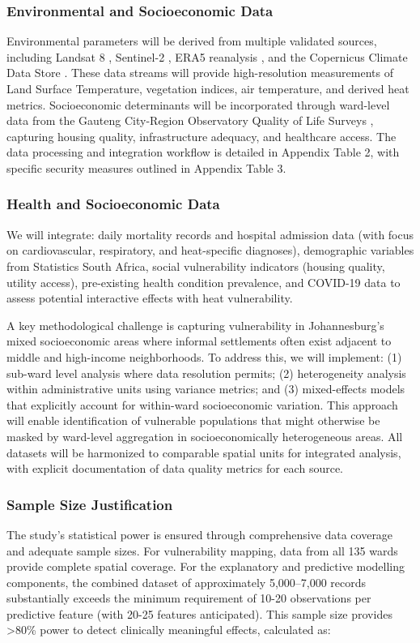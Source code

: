 \subsubsection{Environmental and Socioeconomic Data}
Environmental parameters will be derived from multiple validated sources, including Landsat 8 \citep{landsat8}, Sentinel-2 \citep{sentinel2}, ERA5 reanalysis \citep{era5}, and the Copernicus Climate Data Store \citep{copernicus_climate_data_store}. These data streams will provide high-resolution measurements of Land Surface Temperature, vegetation indices, air temperature, and derived heat metrics. Socioeconomic determinants will be incorporated through ward-level data from the Gauteng City-Region Observatory Quality of Life Surveys \citep{gcro_qol_survey}, capturing housing quality, infrastructure adequacy, and healthcare access. The data processing and integration workflow is detailed in Appendix Table 2, with specific security measures outlined in Appendix Table 3.

\subsubsection{Health and Socioeconomic Data}
We will integrate: daily mortality records and hospital admission data (with focus on cardiovascular, respiratory, and heat-specific diagnoses), demographic variables from Statistics South Africa, social vulnerability indicators (housing quality, utility access), pre-existing health condition prevalence, and COVID-19 data to assess potential interactive effects with heat vulnerability. 

A key methodological challenge is capturing vulnerability in Johannesburg's mixed socioeconomic areas where informal settlements often exist adjacent to middle and high-income neighborhoods. To address this, we will implement: (1) sub-ward level analysis where data resolution permits; (2) heterogeneity analysis within administrative units using variance metrics; and (3) mixed-effects models that explicitly account for within-ward socioeconomic variation. This approach will enable identification of vulnerable populations that might otherwise be masked by ward-level aggregation in socioeconomically heterogeneous areas. All datasets will be harmonized to comparable spatial units for integrated analysis, with explicit documentation of data quality metrics for each source.

\subsubsection{Sample Size Justification}
The study's statistical power is ensured through comprehensive data coverage and adequate sample sizes. For vulnerability mapping, data from all 135 wards provide complete spatial coverage. For the explanatory and predictive modelling components, the combined dataset of approximately 5,000--7,000 records substantially exceeds the minimum requirement of 10-20 observations per predictive feature (with 20-25 features anticipated). This sample size provides >80\% power to detect clinically meaningful effects, calculated as:

